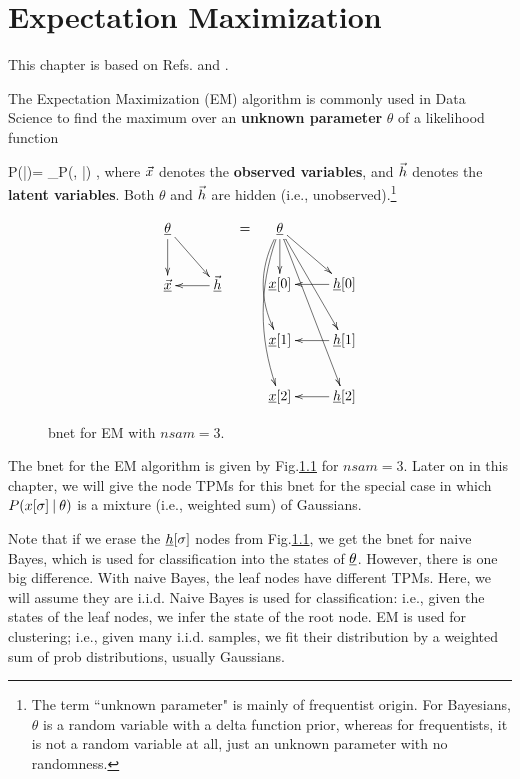 \chapter{Expectation Maximization}
\label{ch-emax}

This chapter is based on 
Refs.\cite{wiki-em}
and \cite{emory-biostat}.

The Expectation Maximization (EM) 
algorithm 
is commonly used in Data Science 
to find the maximum
over an {\bf unknown parameter} $\theta$ of a
 likelihood function 

\beq
P(\vecx|\theta)=
\sum_\vech P(\vecx, \vech|\theta)
\;,
\eeq
where ${\vec{x}}$
denotes the {\bf observed variables},
and ${\vec{h}}$ denotes the
{\bf latent variables}.
Both $\theta$
and ${\vec{h}}$
are hidden (i.e.,
unobserved).\footnote{
The term
``unknown parameter"
is mainly of frequentist origin.
For Bayesians, $\theta$
is a random variable with
a delta function prior,
whereas for frequentists,
it is not
a random variable at all, 
just an unknown parameter
with no randomness.}



\begin{figure}[h!]
\centering
$$\begin{array}{ccc}
\xymatrix{
\ul{\theta}\ar[d]\ar[dr]
\\
\ul{\vecx}&\ul{\vech}\ar[l]
}
&=&
\xymatrix{
\ul{\theta}
\ar[d]
\ar@/_1pc/[dd]
\ar@/_1pc/[ddd]
\ar[rd]\ar[rdd]\ar[rddd]
\\
\rvx[0]
&\rvh[0]\ar[l]
\\
\rvx[1]
&\rvh[1]\ar[l]
\\
\rvx[2]
&\rvh[2]\ar[l]
}
\end{array}
$$
\caption{bnet for EM with $nsam=3$.}
\label{fig-em-bnet}
\end{figure}


The bnet for the EM algorithm
is given by Fig.\ref{fig-em-bnet}
for $nsam=3$.
Later on in this chapter,
we will give the node TPMs
for this bnet for
the special
case in which $P(x[\sigma]{\:\mathbf{|}\:} \theta)$
is a mixture (i.e., weighted sum)
of Gaussians.

Note that if we 
erase the ${\underline{h}}[\sigma]$ nodes
from Fig.\ref{fig-em-bnet},
we get the bnet for naive Bayes,
which is used for classification
into the states of $\underline{\theta}$.
However, there is one big
difference. 
With naive Bayes,
the leaf nodes have
different TPMs.
Here, we will assume they are i.i.d.
Naive Bayes is used for classification: i.e., 
given the states 
of the leaf nodes,
we infer the state of the root node.
EM is used for clustering; i.e.,
given many i.i.d. samples,
we fit their distribution by a weighted sum
of prob distributions,
usually Gaussians.

